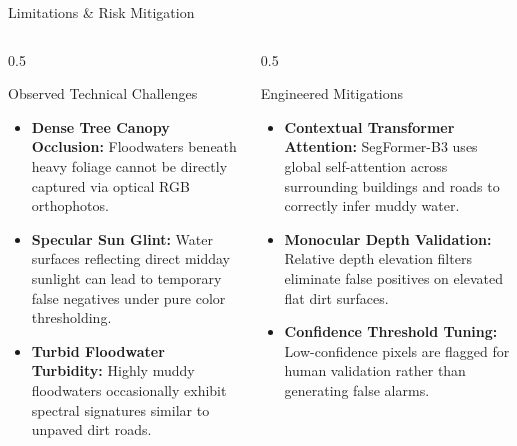 \documentclass[aspectratio=169, 10pt, professionalfonts]{beamer}
\begin{document}
\begin{frame}{Limitations \& Risk Mitigation}
  \begin{columns}[T]
    \begin{column}{0.5\textwidth}
      \begin{block}{Observed Technical Challenges}
        \begin{itemize}\setlength{\itemsep}{0.5em}\footnotesize
          \item \textbf{Dense Tree Canopy Occlusion:} Floodwaters beneath heavy foliage cannot be directly captured via optical RGB orthophotos.
          \item \textbf{Specular Sun Glint:} Water surfaces reflecting direct midday sunlight can lead to temporary false negatives under pure color thresholding.
          \item \textbf{Turbid Floodwater Turbidity:} Highly muddy floodwaters occasionally exhibit spectral signatures similar to unpaved dirt roads.
        \end{itemize}
      \end{block}
    \end{column}
    
    \begin{column}{0.5\textwidth}
      \begin{block}{Engineered Mitigations}
        \begin{itemize}\setlength{\itemsep}{0.5em}\footnotesize
          \item \textbf{Contextual Transformer Attention:} SegFormer-B3 uses global self-attention across surrounding buildings and roads to correctly infer muddy water.
          \item \textbf{Monocular Depth Validation:} Relative depth elevation filters eliminate false positives on elevated flat dirt surfaces.
          \item \textbf{Confidence Threshold Tuning:} Low-confidence pixels are flagged for human validation rather than generating false alarms.
        \end{itemize}
      \end{block}
    \end{column}
  \end{columns}
\end{frame}
\end{document}
